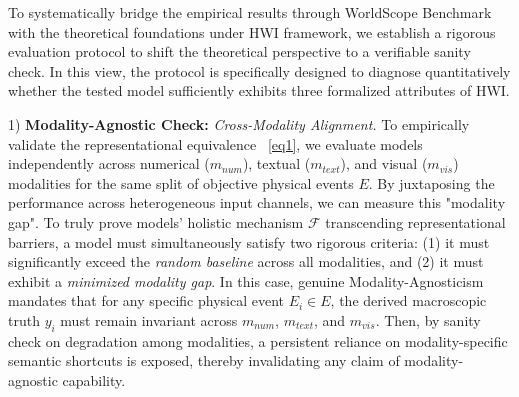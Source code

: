 To systematically bridge the empirical results through WorldScope Benchmark with the theoretical foundations under HWI framework, we establish a rigorous evaluation protocol to shift the theoretical perspective to a verifiable sanity check. In this view, the protocol is specifically designed to diagnose quantitatively whether the tested model sufficiently exhibits three formalized attributes of HWI.

1) \textbf{Modality-Agnostic Check:} \emph{Cross-Modality Alignment.} 
To empirically validate the representational equivalence ~\ref{eq1}, we evaluate models independently across numerical ($m_{num}$), textual ($m_{text}$), and visual ($m_{vis}$) modalities for the same split of objective physical events $E$. 
By juxtaposing the performance across heterogeneous input channels, we can measure this "modality gap". 
To truly prove models' holistic mechanism $\mathcal{F}$ transcending representational barriers, a model must simultaneously satisfy two rigorous criteria: (1) it must significantly exceed the \emph{random baseline} across all modalities, and (2) it must exhibit a \emph{minimized modality gap}.
In this case, genuine Modality-Agnosticism mandates that for any specific physical event $E_i \in E$, the derived macroscopic truth $y_i$ must remain invariant across $m_{num}$, $m_{text}$, and $m_{vis}$. 
Then, by sanity check on degradation among modalities, a persistent reliance on modality-specific semantic shortcuts is exposed, thereby invalidating any claim of modality-agnostic capability.


